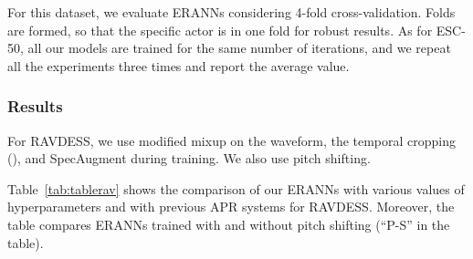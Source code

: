 \documentclass{article}
\begin{document}
\begin{sloppy}
For this dataset, we evaluate ERANNs considering 4-fold cross-validation. Folds are formed, so that the specific actor is in one fold for robust results. As for ESC-50, all our models are trained for the same number of iterations, and we repeat all the experiments three times and report the average value.

\subsubsection{Results}

For RAVDESS, we use modified mixup on the waveform, the temporal cropping (), and SpecAugment during training. We also use pitch shifting. 

Table~\ref{tab:tablerav} shows the comparison of our ERANNs with various values of hyperparameters and with previous APR systems for RAVDESS. Moreover, the table compares ERANNs trained with and without pitch shifting (``P-S'' in the table).


\begin{table}[th]
  \caption{Comparison of APR systems for RAVDESS}
  \centering
  \label{tab:tablerav}
\end{table}


\end{sloppy}
\end{document}
